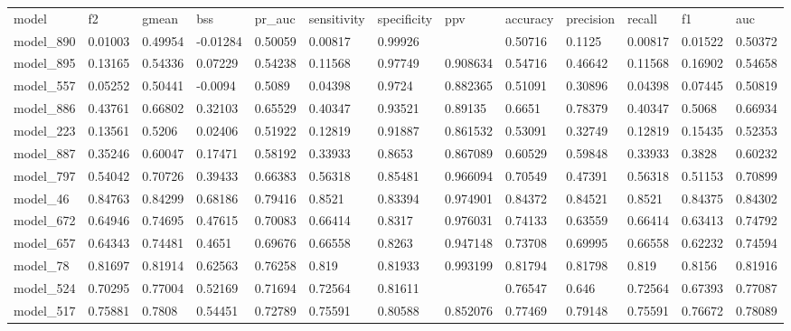 \begin{tabular}{lllllllllllll}
model      & f2      & gmean   & bss      & pr\_auc & sensitivity & specificity & ppv      & accuracy & precision & recall  & f1      & auc     \\
model\_890 & 0.01003 & 0.49954 & -0.01284 & 0.50059 & 0.00817     & 0.99926     &          & 0.50716  & 0.1125    & 0.00817 & 0.01522 & 0.50372 \\
model\_895 & 0.13165 & 0.54336 & 0.07229  & 0.54238 & 0.11568     & 0.97749     & 0.908634 & 0.54716  & 0.46642   & 0.11568 & 0.16902 & 0.54658 \\
model\_557 & 0.05252 & 0.50441 & -0.0094  & 0.5089  & 0.04398     & 0.9724      & 0.882365 & 0.51091  & 0.30896   & 0.04398 & 0.07445 & 0.50819 \\
model\_886 & 0.43761 & 0.66802 & 0.32103  & 0.65529 & 0.40347     & 0.93521     & 0.89135  & 0.6651   & 0.78379   & 0.40347 & 0.5068  & 0.66934 \\
model\_223 & 0.13561 & 0.5206  & 0.02406  & 0.51922 & 0.12819     & 0.91887     & 0.861532 & 0.53091  & 0.32749   & 0.12819 & 0.15435 & 0.52353 \\
model\_887 & 0.35246 & 0.60047 & 0.17471  & 0.58192 & 0.33933     & 0.8653      & 0.867089 & 0.60529  & 0.59848   & 0.33933 & 0.3828  & 0.60232 \\
model\_797 & 0.54042 & 0.70726 & 0.39433  & 0.66383 & 0.56318     & 0.85481     & 0.966094 & 0.70549  & 0.47391   & 0.56318 & 0.51153 & 0.70899 \\
model\_46  & 0.84763 & 0.84299 & 0.68186  & 0.79416 & 0.8521      & 0.83394     & 0.974901 & 0.84372  & 0.84521   & 0.8521  & 0.84375 & 0.84302 \\
model\_672 & 0.64946 & 0.74695 & 0.47615  & 0.70083 & 0.66414     & 0.8317      & 0.976031 & 0.74133  & 0.63559   & 0.66414 & 0.63413 & 0.74792 \\
model\_657 & 0.64343 & 0.74481 & 0.4651   & 0.69676 & 0.66558     & 0.8263      & 0.947148 & 0.73708  & 0.69995   & 0.66558 & 0.62232 & 0.74594 \\
model\_78  & 0.81697 & 0.81914 & 0.62563  & 0.76258 & 0.819       & 0.81933     & 0.993199 & 0.81794  & 0.81798   & 0.819   & 0.8156  & 0.81916 \\
model\_524 & 0.70295 & 0.77004 & 0.52169  & 0.71694 & 0.72564     & 0.81611     &          & 0.76547  & 0.646     & 0.72564 & 0.67393 & 0.77087 \\
model\_517 & 0.75881 & 0.7808  & 0.54451  & 0.72789 & 0.75591     & 0.80588     & 0.852076 & 0.77469  & 0.79148   & 0.75591 & 0.76672 & 0.78089 \\

\end{tabular}
